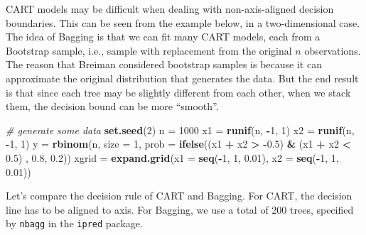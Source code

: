 \documentclass[
]{book}
\newenvironment{Shaded}{\begin{snugshade}}{\end{snugshade}}
\newcommand{\AttributeTok}[1]{\textcolor[rgb]{0.13,0.29,0.53}{#1}}
\newcommand{\CommentTok}[1]{\textcolor[rgb]{0.56,0.35,0.01}{\textit{#1}}}
\newcommand{\DecValTok}[1]{\textcolor[rgb]{0.00,0.00,0.81}{#1}}
\newcommand{\FloatTok}[1]{\textcolor[rgb]{0.00,0.00,0.81}{#1}}
\newcommand{\FunctionTok}[1]{\textcolor[rgb]{0.13,0.29,0.53}{\textbf{#1}}}
\newcommand{\NormalTok}[1]{#1}
\newcommand{\OtherTok}[1]{\textcolor[rgb]{0.56,0.35,0.01}{#1}}
\newcommand{\SpecialCharTok}[1]{\textcolor[rgb]{0.81,0.36,0.00}{\textbf{#1}}}
\theoremstyle{definition}
\theoremstyle{definition}
\theoremstyle{definition}
\theoremstyle{definition}
\theoremstyle{remark}
\begin{document}
CART models may be difficult when dealing with non-axis-aligned decision boundaries. This can be seen from the example below, in a two-dimensional case. The idea of Bagging is that we can fit many CART models, each from a Bootstrap sample, i.e., sample with replacement from the original \(n\) observations. The reason that Breiman considered bootstrap samples is because it can approximate the original distribution that generates the data. But the end result is that since each tree may be slightly different from each other, when we stack them, the decision bound can be more ``smooth''.

\begin{Shaded}
\begin{Highlighting}[]
  \CommentTok{\# generate some data }
  \FunctionTok{set.seed}\NormalTok{(}\DecValTok{2}\NormalTok{)}
\NormalTok{  n }\OtherTok{=} \DecValTok{1000}
\NormalTok{  x1 }\OtherTok{=} \FunctionTok{runif}\NormalTok{(n, }\SpecialCharTok{{-}}\DecValTok{1}\NormalTok{, }\DecValTok{1}\NormalTok{)}
\NormalTok{  x2 }\OtherTok{=} \FunctionTok{runif}\NormalTok{(n, }\SpecialCharTok{{-}}\DecValTok{1}\NormalTok{, }\DecValTok{1}\NormalTok{)}
\NormalTok{  y }\OtherTok{=} \FunctionTok{rbinom}\NormalTok{(n, }\AttributeTok{size =} \DecValTok{1}\NormalTok{, }\AttributeTok{prob =} \FunctionTok{ifelse}\NormalTok{((x1 }\SpecialCharTok{+}\NormalTok{ x2 }\SpecialCharTok{\textgreater{}} \SpecialCharTok{{-}}\FloatTok{0.5}\NormalTok{) }\SpecialCharTok{\&}\NormalTok{ (x1 }\SpecialCharTok{+}\NormalTok{ x2 }\SpecialCharTok{\textless{}} \FloatTok{0.5}\NormalTok{) , }\FloatTok{0.8}\NormalTok{, }\FloatTok{0.2}\NormalTok{))}
\NormalTok{  xgrid }\OtherTok{=} \FunctionTok{expand.grid}\NormalTok{(}\AttributeTok{x1 =} \FunctionTok{seq}\NormalTok{(}\SpecialCharTok{{-}}\DecValTok{1}\NormalTok{, }\DecValTok{1}\NormalTok{, }\FloatTok{0.01}\NormalTok{), }\AttributeTok{x2 =} \FunctionTok{seq}\NormalTok{(}\SpecialCharTok{{-}}\DecValTok{1}\NormalTok{, }\DecValTok{1}\NormalTok{, }\FloatTok{0.01}\NormalTok{))}
\end{Highlighting}
\end{Shaded}

Let's compare the decision rule of CART and Bagging. For CART, the decision line has to be aligned to axis. For Bagging, we use a total of 200 trees, specified by \texttt{nbagg} in the \texttt{ipred} package.
\end{document}

